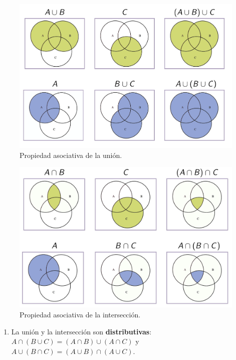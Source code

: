 \documentclass[
]{book}
\providecommand{\tightlist}{%
  \setlength{\itemsep}{0pt}\setlength{\parskip}{0pt}}
\theoremstyle{definition}
\theoremstyle{definition}
\theoremstyle{definition}
\theoremstyle{definition}
\theoremstyle{remark}
\begin{document}
\begin{figure}

{\centering \includegraphics[width=0.8\linewidth]{INREMDN_files/figure-html/assocunio} 

}

\caption{Propiedad asociativa de la unión.}\label{fig:unnamed-chunk-87}
\end{figure}

\begin{figure}

{\centering \includegraphics[width=0.8\linewidth]{INREMDN_files/figure-html/assocint} 

}

\caption{Propiedad asociativa de la intersección.}\label{fig:unnamed-chunk-88}
\end{figure}

\begin{enumerate}
\def\labelenumi{\alph{enumi}.}
\setcounter{enumi}{3}
\tightlist
\item
  La unión y la intersección son \textbf{distributivas}: \(A\cap(B\cup C)=(A\cap B)\cup (A\cap C)\) y \(A\cup(B\cap C)=(A\cup B)\cap (A\cup C)\).
\end{enumerate}
\end{document}
